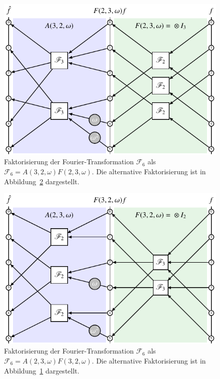 \begin{figure}
\centering
\includegraphics{chapters/060-diskret/images/f32.pdf}
\caption{Faktorisierung der Fourier-Transformation $\mathscr{F}_6$ als
$\mathscr{F}_6=A(3,2,\omega)F(2,3,\omega)$.
Die alternative Faktorisierung ist in
Abbildung~\ref{buch:diskret:faktorisierung:fig:f23}
dargestellt.
\label{buch:diskret:faktorisierung:fig:f32}}
\end{figure}
\begin{figure}
\centering
\includegraphics{chapters/060-diskret/images/f23.pdf}
\caption{Faktorisierung der Fourier-Transformation $\mathscr{F}_6$ als
$\mathscr{F}_6=A(2,3,\omega)F(3,2,\omega)$.
Die alternative Faktorisierung ist in
Abbildung~\ref{buch:diskret:faktorisierung:fig:f32}
dargestellt.
\label{buch:diskret:faktorisierung:fig:f23}}
\end{figure}

